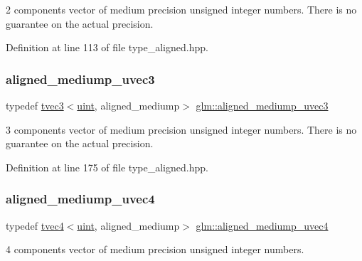 2 components vector of medium precision unsigned integer numbers. There is no guarantee on the actual precision. 

Definition at line 113 of file type\+\_\+aligned.\+hpp.

\mbox{\label{group__gtc__type__aligned_ga7d2ad25929896f2c0fa15eec440b8074}} 
\subsubsection{\texorpdfstring{aligned\_mediump\_uvec3}{aligned\_mediump\_uvec3}}
{\footnotesize\ttfamily typedef \mbox{\hyperlink{structglm_1_1tvec3}{tvec3}}$<$\mbox{\hyperlink{group__core__precision_ga4fd29415871152bfb5abd588334147c8}{uint}}, aligned\+\_\+mediump$>$ \mbox{\hyperlink{group__gtc__type__aligned_ga7d2ad25929896f2c0fa15eec440b8074}{glm\+::aligned\+\_\+mediump\+\_\+uvec3}}}

3 components vector of medium precision unsigned integer numbers. There is no guarantee on the actual precision. 

Definition at line 175 of file type\+\_\+aligned.\+hpp.

\mbox{\label{group__gtc__type__aligned_gadce20b2c78b77cf2f08bc9c31d1a822e}} 
\subsubsection{\texorpdfstring{aligned\_mediump\_uvec4}{aligned\_mediump\_uvec4}}
{\footnotesize\ttfamily typedef \mbox{\hyperlink{structglm_1_1tvec4}{tvec4}}$<$\mbox{\hyperlink{group__core__precision_ga4fd29415871152bfb5abd588334147c8}{uint}}, aligned\+\_\+mediump$>$ \mbox{\hyperlink{group__gtc__type__aligned_gadce20b2c78b77cf2f08bc9c31d1a822e}{glm\+::aligned\+\_\+mediump\+\_\+uvec4}}}



4 components vector of medium precision unsigned integer numbers. 



